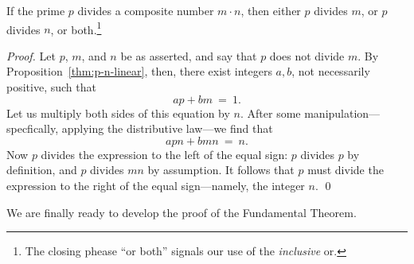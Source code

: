 \begin{prop}
\label{thm:p-divides-onefactor}
If the prime $p$ divides a composite number $m \cdot n$, then either
$p$ divides $m$, or $p$ divides $n$, or both.\footnote{The closing
  phease ``or both'' signals our use of the {\em inclusive} or.}
\end{prop}

\begin{proof}
Let $p$, $m$, and $n$ be as asserted, and say that $p$ does not divide
$m$.  By Proposition~\ref{thm:p-n-linear}, then, there exist integers
$a, b$, not necessarily positive, such that
\[ ap + bm \ = \ 1. \]
Let us multiply both sides of this equation by $n$.  After some
manipulation---specfically, applying the distributive law---we find
that
\[ apn + bmn \ = \ n. \]
Now $p$ divides the expression to the left of the equal sign: $p$
divides $p$ by definition, and $p$ divides $mn$ by assumption.  It
follows that $p$ must divide the expression to the right of the equal
sign---namely, the integer $n$.  \qed
\end{proof}

We are finally ready to develop the proof of the Fundamental Theorem.


